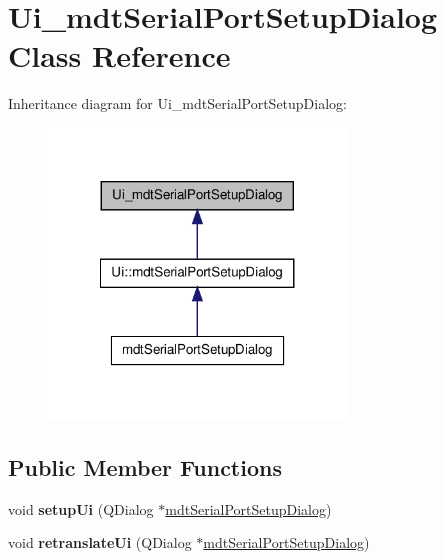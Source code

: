 \hypertarget{class_ui__mdt_serial_port_setup_dialog}{
\section{Ui\_\-mdtSerialPortSetupDialog Class Reference}
\label{class_ui__mdt_serial_port_setup_dialog}
}


Inheritance diagram for Ui\_\-mdtSerialPortSetupDialog:\nopagebreak
\begin{figure}[H]
\begin{center}
\leavevmode
\includegraphics[width=224pt]{class_ui__mdt_serial_port_setup_dialog__inherit__graph}
\end{center}
\end{figure}
\subsection*{Public Member Functions}
\begin{DoxyCompactItemize}
\item 
\hypertarget{class_ui__mdt_serial_port_setup_dialog_a87469f82d3434e0f1dfc4d2fc8b5fe70}{
void {\bfseries setupUi} (QDialog $\ast$\hyperlink{classmdt_serial_port_setup_dialog}{mdtSerialPortSetupDialog})}
\label{class_ui__mdt_serial_port_setup_dialog_a87469f82d3434e0f1dfc4d2fc8b5fe70}

\item 
\hypertarget{class_ui__mdt_serial_port_setup_dialog_a7c928e55ed37a6a05d178fa6e45c0ef2}{
void {\bfseries retranslateUi} (QDialog $\ast$\hyperlink{classmdt_serial_port_setup_dialog}{mdtSerialPortSetupDialog})}
\label{class_ui__mdt_serial_port_setup_dialog_a7c928e55ed37a6a05d178fa6e45c0ef2}

\end{DoxyCompactItemize}
